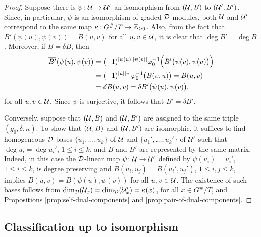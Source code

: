 \begin{proof}
    Suppose there is $\psi\colon \mathcal U \to \mathcal U'$ an isomorphism from $(\mathcal U, B)$ to $(\mathcal U', B')$. Since, in particular, $\psi$ is an isomorphism of graded $\mathcal{D}$-modules, both $\mathcal U$ and $\mathcal U'$ correspond to the same map $\kappa\colon G^\#/T \to \mathbb{Z}_{\geq 0}$. 
    Also, from the fact that $B'(\psi(u), \psi(v)) = B(u, v)$ for all $u, v\in \mathcal U$, it is clear that $\deg B' = \deg B$.
    Moreover, if $\overline{B} = \delta B$, then
    \begin{align*}
        \overline{B'} \big(\psi(u), \psi(v) \big) &= (-1)^{|\psi(u)||\psi(v)|} \varphi_0^{-1} \Big( B'\big( \psi(v) , \psi(u) \big) \Big) \\
        &= (-1)^{|u||v|} \varphi_0^{-1} \big( B(v, u) \big) 
        = \overline{B} (u, v) \\
        &= \delta B(u, v) = \delta B' \big( \psi(u), \psi(v) \big),
    \end{align*}
    for all $u, v \in \mathcal U$. 
    Since $\psi$ is surjective, it follows that $\overline{B'} = \delta B'$. 
    
    Conversely, suppose that $(\mathcal U, B)$ and $(\mathcal U, B')$ are assigned to the same triple $(g_0, \delta, \kappa)$. 
    To show that $(\mathcal U, B)$ and $(\mathcal U, B')$ are isomorphic, it suffices to find homogeneous $\mathcal{D}$-bases $\{u_1, \ldots, u_k\}$ of $\mathcal U$ and $\{u_1', \ldots, u_k'\}$ of $\mathcal U'$ such that $\deg u_i = \deg u_i'$, $1 \leq i \leq k$, and $B$ and $B'$ are represented by the same matrix. 
    Indeed, in this case the $\mathcal{D}$-linear map $\psi\colon \mathcal U \to \mathcal U'$ defined by $\psi(u_i) = u_i'$, $1 \leq i \leq k$, is degree preserving and $B(u_i, u_j) = B(u_i', u_j')$, $1 \leq i,j \leq k$, implies $B(u, v) = B( \psi(u), \psi(v) )$ for all $u, v\in \mathcal U$. 
    The existence of such bases follows from $\dim_{\mathcal{D}} (\mathcal U_x) = \dim_{\mathcal{D}} (\mathcal U_x') = \kappa(x)$, for all $x \in G^\#/T$, and Propositions \ref{prop:self-dual-components} and \ref{prop:pair-of-dual-components}. 
\end{proof}


\subsection{Classification up to isomorphism}

